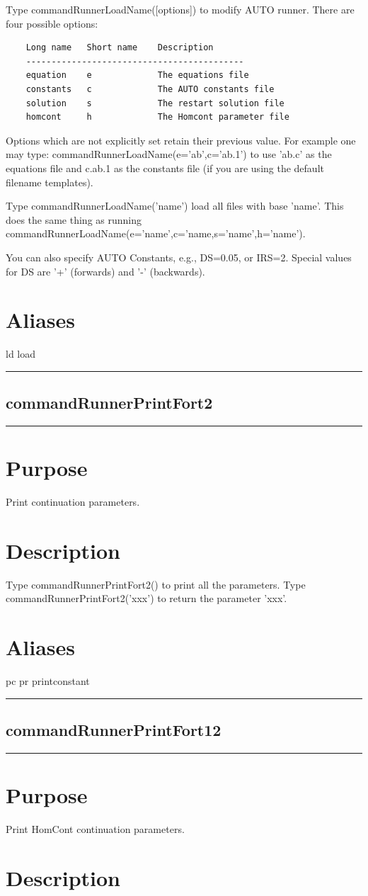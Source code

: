 \documentclass[12pt]{report}
\begin{document}
\begin{minipage}{6in}
    Type commandRunnerLoadName([options]) to modify AUTO runner.
    There are four possible options:
    \begin{verbatim}
    Long name   Short name    Description
    -------------------------------------------
    equation    e             The equations file
    constants   c             The AUTO constants file
    solution    s             The restart solution file
    homcont     h             The Homcont parameter file
    \end{verbatim}
    Options which are not explicitly set retain their previous value.
    For example one may type: commandRunnerLoadName(e='ab',c='ab.1') to use 'ab.c' as
    the equations file and c.ab.1 as the constants file (if you are
    using the default filename templates).

    Type commandRunnerLoadName('name') load all files with base 'name'.
    This does the same thing as running
    commandRunnerLoadName(e='name',c='name,s='name',h='name').
 
    You can also specify AUTO Constants, e.g., DS=0.05, or IRS=2.
    Special values for DS are '+' (forwards) and '-' (backwards).
   \section*{Aliases}
ld load \medskip\hrule\end{minipage}\subsection{commandRunnerPrintFort2} \label{sec:clui_ref_commandRunnerPrintFort2}\begin{minipage}{6in}\hrule\medskip\section*{Purpose}
Print continuation parameters.\section*{Description}

    Type commandRunnerPrintFort2() to print all the parameters.
    Type commandRunnerPrintFort2('xxx') to return the parameter 'xxx'.
    \section*{Aliases}
pc pr printconstant \medskip\hrule\end{minipage}\subsection{commandRunnerPrintFort12} \label{sec:clui_ref_commandRunnerPrintFort12}\begin{minipage}{6in}\hrule\medskip\section*{Purpose}
Print HomCont continuation parameters.\section*{Description}


\end{minipage}
\end{document}
